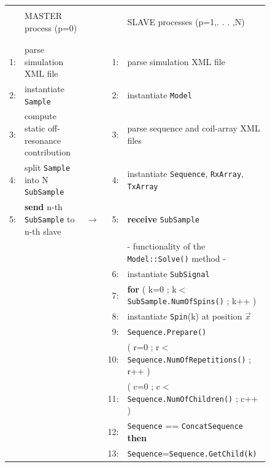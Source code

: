 \documentclass[journal,onecolumn,12pt]{IEEEtran}
\begin{document}
\begin{figure}[hbtb]
  \begin{center}
  {\footnotesize
   \begin{tabular}{|rlcrl|}
   \hline
      &								& &	   &							\\
      & MASTER process (p=0)					& &	   &	SLAVE processes (p=1,. . . ,N)			\\
      &								& &	   &							\\
    \hline
      &								& &	   &							\\
    1:&parse simulation XML file				& &	1: &parse simulation XML file				\\
    2:&instantiate \verb+Sample+ 				& &	2: &instantiate \verb+Model+ 		    		\\
    3:&compute static off-resonance contribution		& &	3: &parse sequence and coil-array XML files		\\
    4:&split \verb+Sample+ into N \verb+SubSample+ 		& &	4: &instantiate \verb+Sequence+, \verb+RxArray+, \verb+TxArray+   	\\
    5:&{\bf send} n-th \verb+SubSample+ to n-th slave	&$\longrightarrow$&	5: &{\bf receive} \verb+SubSample+		\\
      &								& &	   & - functionality of the \verb+Model::Solve()+ method -	\\
      &								& &	6: &instantiate \verb+SubSignal+				\\
      &								& &	7: &{\bf for} ( k=0 ; k$<$\verb+SubSample.NumOfSpins()+ ; k++ )		\\
      &								& &	8: &\hspace*{.2cm}instantiate \verb+Spin+(k) at position $\vec{x}$		\\
      &								& &	9: &\hspace*{.2cm}\verb+Sequence.Prepare()+					\\
      &								& &	10:&\hspace*{.2cm}{\bf for} ( r=0 ; r$<$\verb+Sequence.NumOfRepetitions()+ ; r++ )\\
      &								& &	11:&\hspace*{.3cm}{\bf for} ( c=0 ; c$<$\verb+Sequence.NumOfChildren()+ ; c++ )	\\
      &								& &	12:&\hspace*{.4cm}{\bf if} \verb+Sequence+ == \verb+ConcatSequence+ {\bf then}	\\
      &								& &	13:&\hspace*{.5cm}\verb+Sequence+=\verb+Sequence.GetChild(k)+			\\

\end{tabular}}
\end{center}
\end{figure}
\end{document}
